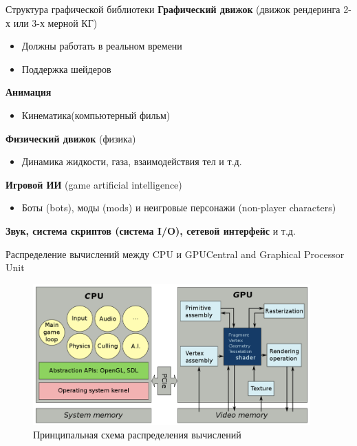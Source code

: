 \documentclass{beamer}
\begin{document}
\begin{frame}{Структура графической библиотеки}
	\textbf{Графический движок} (движок рендеринга 2-х или 3-х мерной КГ)
	
	
	\begin{itemize}
		\item 
		Должны работать в реальном времени
		\item 
		Поддержка шейдеров
	\end{itemize}
	
	\textbf{Анимация}
	\begin{itemize}
		\item 
		Кинематика(компьютерный фильм)
	\end{itemize}
	
	\textbf{Физический движок }(физика)
	\begin{itemize}
		\item 
		Динамика жидкости, газа, взаимодействия тел и т.д.
	\end{itemize}

	\textbf{Игровой ИИ} (game artificial intelligence)
	\begin{itemize}
		\item 
		Боты (bots), моды (mods) и неигровые персонажи (non-player characters)
	\end{itemize}
	
	\textbf{Звук, система скриптов (система I/O), сетевой интерфейс} и т.д.
\end{frame}

\begin{frame}{Распределение вычислений между CPU и GPU}{Central and Graphical Processor Unit}
	\begin{figure} 
		\includegraphics[width=0.95\textwidth]{images/Calculation_distribution_scheme.png}
		\caption {Принципальная схема распределения вычислений}
	\end{figure}
\end{frame}
\end{document}
